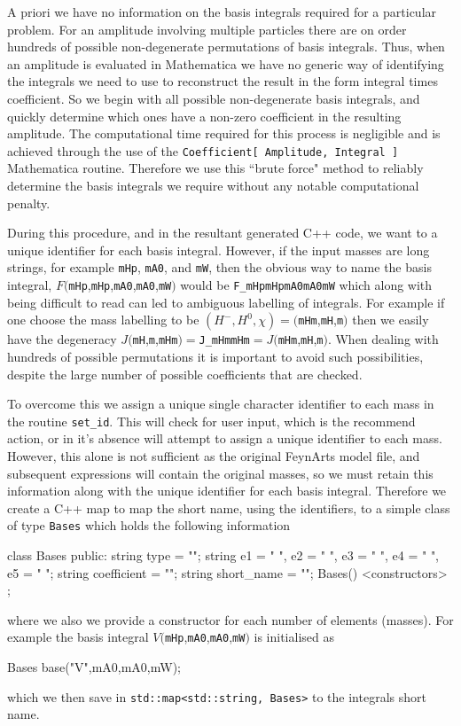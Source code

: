 A priori we have no information on the basis integrals required for a particular problem.  For an amplitude involving multiple particles there are on order hundreds of possible non-degenerate permutations of basis integrals.  Thus, when an amplitude is evaluated in Mathematica we have no generic way of identifying the integrals we need to use to reconstruct the result in the form integral times coefficient.  So we begin with all possible non-degenerate basis integrals, and quickly determine which ones have a non-zero coefficient in the resulting amplitude.  The computational time required for this process is negligible and is achieved through the use of the \lstinline{Coefficient[ Amplitude, Integral ] } Mathematica routine.  Therefore we use this ``brute force" method to reliably determine the basis integrals we require without any notable computational penalty.

During this procedure, and in the resultant generated C++ code, we want to a unique identifier for each basis integral.  However, if the input masses are long strings, for example \lstinline{mHp}, \lstinline{mA0}, and \lstinline{mW}, then the obvious way to name the basis integral, $F($\lstinline{mHp},\lstinline{mHp},\lstinline{mA0},\lstinline{mA0},\lstinline{mW}$)$ would be \lstinline{F_mHpmHpmA0mA0mW} which along with being difficult to read can led to ambiguous labelling of integrals.  For example if one choose the mass labelling to be $(H^-, H^0, \chi ) = ($\lstinline{mHm},\lstinline{mH},\lstinline{m}$)$ then we easily have the degeneracy $J($\lstinline{mH},\lstinline{m},\lstinline{mHm}$) =  $\lstinline{J_mHmmHm}$ = J($\lstinline{mHm},\lstinline{mH},\lstinline{m}$)$.  When dealing with hundreds of possible permutations it is important to avoid such possibilities, despite the large number of possible coefficients that are checked.

To overcome this we assign a unique single character identifier to each mass in the routine \lstinline{set_id}.  This will check for user input, which is the recommend action, or in it's absence will attempt to assign a unique identifier to each mass.  However, this alone is not sufficient as the original FeynArts model file, and subsequent expressions will contain the original masses, so we must retain this information along with the unique identifier for each basis integral.  Therefore we create a C++ map to map the short name, using the identifiers, to a simple class of type \lstinline{Bases} which holds the following information
\begin{lstcpp}
class Bases
{
public:
string type = "";
string e1 = " ", e2 = " ", e3 = " ", e4 = " ", e5 = " ";
string coefficient = "";
string short_name = "";
Bases() {}
<constructors>
};
\end{lstcpp}
where we also we provide a constructor for each number of elements (masses).  For example the basis integral $V($\lstinline{mHp},\lstinline{mA0},\lstinline{mA0},\lstinline{mW}$)$ is initialised as\begin{lstcpp}
Bases base("V",mA0,mA0,mW);
\end{lstcpp}
which we then save in \lstinline{std::map<std::string, Bases>} to the integrals short name.

